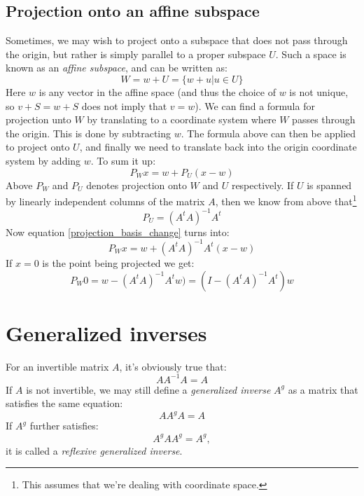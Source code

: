 \documentclass[12pt, a4paper]{article}
\numberwithin{equation}{section}
\begin{document}
\subsection{Projection onto an affine subspace}
Sometimes, we may wish to project onto a subspace that does not pass through the origin, but rather is simply parallel to a proper subspace $U$. Such a space is known as an \textit{affine subspace}, and can be written as:
\begin{equation}
W=w+U=\{w+u|u\in U\}
\end{equation}
Here $w$ is any vector in the affine space (and thus the choice of $w$ is not unique, so $v+S=w+S$ does not imply that $v=w$). We can find a formula for projection unto $W$ by translating to a coordinate system where $W$ passes through the origin. This is done by subtracting $w$. The formula above can then be applied to project onto $U$, and finally we need to translate back into the origin coordinate system by adding $w$. To sum it up:
\begin{equation}
\label{projection_basis_change}
P_W x=w+P_U(x-w)
\end{equation} 
Above $P_W$ and $P_U$ denotes projection onto $W$ and $U$ respectively. If $U$ is spanned by linearly independent columns of the matrix $A$, then we know from above that\footnote{This assumes that we're dealing with coordinate space.}
\begin{equation}
P_U=(A^t A)^{-1}A^t
\end{equation}
Now equation \ref{projection_basis_change} turns into:
\begin{equation}
\label{affine_projection}
P_W x=w+(A^t A)^{-1}A^t(x-w)
\end{equation}
If $x=0$ is the point being projected we get:
\begin{equation}
\label{affine_projection_0}
P_W 0=w-(A^t A)^{-1}A^t w)=(I-(A^t A)^{-1}A^t)w
\end{equation}

\section{Generalized inverses}
For an invertible matrix $A$, it's obviously true that:
\begin{equation}
AA^{-1} A=A
\end{equation}
If $A$ is not invertible, we may still define a \textit{generalized inverse} $A^g$ as a matrix that satisfies the same equation:
\begin{equation}
\label{generalized_inverse}
AA^g A=A
\end{equation}
If $A^g$ further satisfies:
\begin{equation}
\label{reflexive_generalized_inverse}
A^g AA^g=A^g,
\end{equation}
it is called a \textit{reflexive generalized inverse}.
\end{document}
